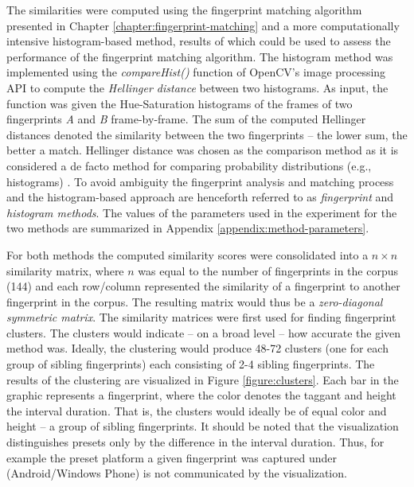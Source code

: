 \documentclass[thesis.tex]{subfiles}
\begin{document}
The similarities were computed using the fingerprint matching algorithm presented in Chapter \ref{chapter:fingerprint-matching} and a more computationally intensive histogram-based method, results of which could be used to assess the performance of the fingerprint matching algorithm. The histogram method was implemented using the \emph{compareHist()} function of OpenCV's image processing API to compute the \emph{Hellinger distance} between two histograms. As input, the function was given the Hue-Saturation histograms of the frames of two fingerprints \emph{A} and \emph{B} frame-by-frame. The sum of the computed Hellinger distances denoted the similarity between the two fingerprints -- the lower sum, the better a match. Hellinger distance was chosen as the comparison method as it is considered a de facto method for comparing probability distributions (e.g., histograms) \cite{hellinger}. To avoid ambiguity the fingerprint analysis and matching process and the histogram-based approach are henceforth referred to as \emph{fingerprint} and \emph{histogram methods}. The values of the parameters used in the experiment for the two methods are summarized in Appendix \ref{appendix:method-parameters}.

For both methods the computed similarity scores were consolidated into a $n\times n$ similarity matrix, where $n$ was equal to the number of fingerprints in the corpus (144) and each row/column represented the similarity of a fingerprint to another fingerprint in the corpus. The resulting matrix would thus be a \emph{zero-diagonal symmetric matrix}. The similarity matrices were first used for finding fingerprint clusters. The clusters would indicate -- on a broad level -- how accurate the given method was. Ideally, the clustering would produce 48-72 clusters (one for each group of sibling fingerprints) each consisting of 2-4 sibling fingerprints. The results of the clustering are visualized in Figure \ref{figure:clusters}. Each bar in the graphic represents a fingerprint, where the color denotes the taggant and height the interval duration. That is, the clusters would ideally be of equal color and height -- a group of sibling fingerprints. It should be noted that the visualization distinguishes presets only by the difference in the interval duration. Thus, for example the preset platform a given fingerprint was captured under (Android/Windows Phone) is not communicated by the visualization.
\end{document}
